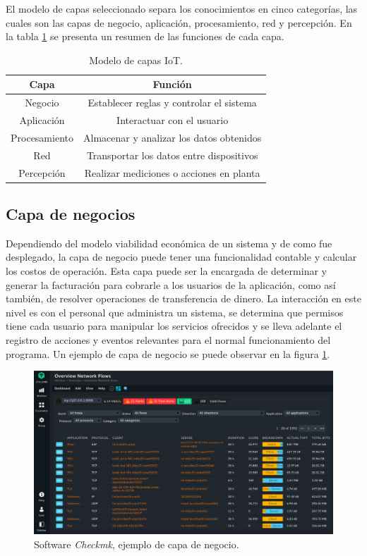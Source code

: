 El modelo de capas seleccionado separa los conocimientos en cinco categorías, las cuales son las capas de negocio, aplicación, procesamiento, red y percepción.
En la tabla \ref{tab:modeloCapas} se presenta un resumen de las funciones de cada capa.

\begin{table}[h]
	\centering
	\caption{\label{tab:modeloCapas}Modelo de capas IoT.}
	\begin{tabular}{c c}
		\toprule
		\textbf{Capa} & \textbf{Función}                         \\
		\midrule
		Negocio       & Establecer reglas y controlar el sistema \\
		Aplicación    & Interactuar con el usuario               \\
		Procesamiento & Almacenar y analizar los datos obtenidos \\
		Red           & Transportar los datos entre dispositivos \\
		Percepción    & Realizar mediciones o acciones en planta \\
		\bottomrule
		\hline
	\end{tabular}
\end{table}

\subsection{Capa de negocios}
Dependiendo del modelo viabilidad económica de un sistema y de como fue desplegado, la capa de negocio puede tener una funcionalidad contable y calcular los costos de operación.
Esta capa puede ser la encargada de determinar y generar la facturación para cobrarle a los usuarios de la aplicación, como así también, de resolver operaciones de transferencia de dinero.
La interacción en este nivel es con el personal que administra un sistema, se determina que permisos tiene cada usuario para manipular los servicios ofrecidos y se lleva adelante el registro de acciones y eventos relevantes para el normal funcionamiento del programa.
Un ejemplo de capa de negocio se puede observar en la figura \ref{fig:ch1EjemploNegocio}.

\begin{figure}[h]
	\centering
	\includegraphics[width=\textwidth]{./Figures/ch1EjemploNegocio.png}
	\caption{Software \emph{Checkmk}, ejemplo de capa de negocio. \citep{WEBSITE:checkmk}}
	\label{fig:ch1EjemploNegocio}
\end{figure}


